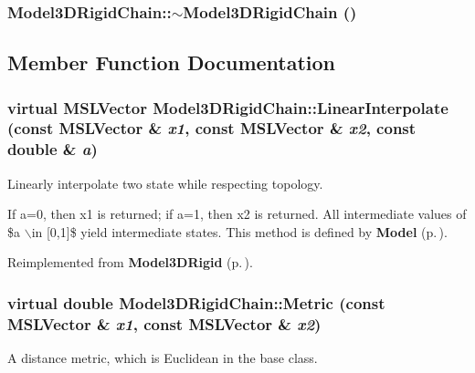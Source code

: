 \subsubsection{\setlength{\rightskip}{0pt plus 5cm}Model3DRigid\-Chain::$\sim$Model3DRigid\-Chain ()\hspace{0.3cm}{\tt  [inline, virtual]}}\label{class_Model3DRigidChain_a1}




\subsection{Member Function Documentation}
\subsubsection{\setlength{\rightskip}{0pt plus 5cm}virtual {\bf MSLVector} Model3DRigid\-Chain::Linear\-Interpolate (const {\bf MSLVector} \& {\em x1}, const {\bf MSLVector} \& {\em x2}, const double \& {\em a})\hspace{0.3cm}{\tt  [virtual]}}\label{class_Model3DRigidChain_a4}


Linearly interpolate two state while respecting topology.

If a=0, then x1 is returned; if a=1, then x2 is returned. All intermediate values of \$a $\backslash$in [0,1]\$ yield intermediate states. This method is defined by {\bf Model} {\rm (p.\,\pageref{class_Model})}. 

Reimplemented from {\bf Model3DRigid} {\rm (p.\,\pageref{class_Model3DRigid_a5})}.
\subsubsection{\setlength{\rightskip}{0pt plus 5cm}virtual double Model3DRigid\-Chain::Metric (const {\bf MSLVector} \& {\em x1}, const {\bf MSLVector} \& {\em x2})\hspace{0.3cm}{\tt  [virtual]}}\label{class_Model3DRigidChain_a5}


A distance metric, which is Euclidean in the base class.



